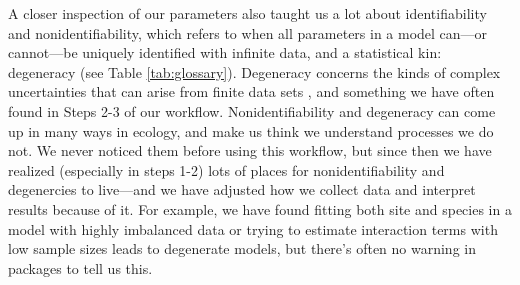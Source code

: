 \documentclass[11pt]{article}
\begin{document}
A closer inspection of our parameters also taught us a lot about identifiability and nonidentifiability, which refers to when all parameters in a model can---or cannot---be uniquely identified with infinite data, and a statistical kin: degeneracy (see Table \ref{tab:glossary}).  Degeneracy concerns the kinds of complex uncertainties that can arise from finite data sets \citep{gelmanhill}, and something we have often found in Steps 2-3 of our workflow.
Nonidentifiability and degeneracy can come up in many ways in ecology, and make us think we understand processes we do not. We never noticed them before using this workflow, but since then we have realized (especially in steps 1-2) lots of places for nonidentifiability and degenercies to live---and we have adjusted how we collect data and interpret results because of it. For example, we have found fitting both site and species in a model with highly imbalanced data or trying to estimate interaction terms with low sample sizes \citep[][for more details]{regotherstories} leads to degenerate models, but there's often no warning in packages to tell us this. 

\end{document}
